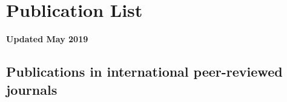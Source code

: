\renewcommand\evenpagerightmark{{\scshape\small Appendix A}}
\renewcommand\oddpageleftmark{{\scshape\small Publication List}}



\chapter[Publication List]{Publication List}
\label{app1}

\textbf{Updated May 2019}
\npar
\section*{Publications in international peer-reviewed journals}

